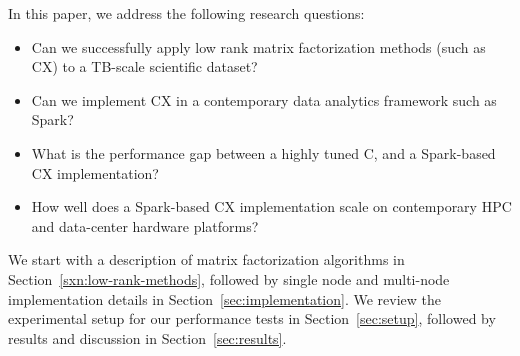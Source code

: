 In this paper, we address the following research questions:
\begin{itemize}
\item Can we successfully apply low rank matrix factorization methods (such as CX) to a TB-scale scientific dataset?

\item Can we implement CX in a contemporary data analytics framework such as Spark?

\item What is the performance gap between a highly tuned C, and a Spark-based CX implementation? 

\item How well does a Spark-based CX implementation scale on contemporary HPC and data-center hardware platforms?
\end{itemize}

We start with a description of matrix factorization algorithms in Section~\ref{sxn:low-rank-methods}, followed by single node and multi-node implementation details in Section~\ref{sec:implementation}. We review the experimental setup for our performance tests in Section~\ref{sec:setup}, followed by results and discussion in Section~\ref{sec:results}.

